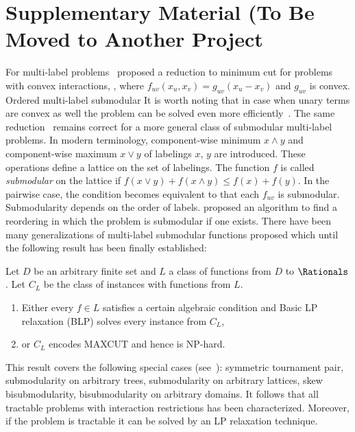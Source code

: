 \section{Supplementary Material (To Be Moved to Another Project}



For multi-label problems~\citet{Ishikawa03} proposed a reduction to minimum cut for problems with convex interactions, \ie, where $f_{uv}(x_u,x_v) = g_{uv}(x_u - x_v)$ and $g_{uv}$ is convex. %
Ordered multi-label submodular
It is worth noting that in case when unary terms are convex as well the problem can be solved even more efficiently~\cite{Hochbaum-2001-MRF,Kolmogorov05primal-dualalgorithm}. %
The same reduction~\cite{Ishikawa03} remains correct for a more general class of submodular multi-label problems. %
In modern terminology, component-wise minimum $x \wedge y$ and component-wise maximum $x \vee y$ of labelings $x$, $y$ are introduced. These operations define a lattice on the set of labelings. The function $f$ is called {\em submodular} on the lattice if $f(x \vee y) + f(x \wedge y) \leq f(x) + f(y)$. In the pairwise case, the condition becomes equivalent to that each $f_{uv}$ is submodular.
Submodularity depends on the order of labels. \citet{DSchlesinger-07-permuted} proposed an algorithm to find a reordering in which the problem is submodular if one exists.
There have been many generalizations of multi-label submodular functions proposed which until the following result has been finally established:
 \begin{theorem}
 Let $D$ be an arbitrary finite set and $L$ a class of functions from $D$ to $\Rationals$. Let $C_L$ be the class of instances with functions from $L$.
 \begin{enumerate}
 \item Either every $f \in L$ satisfies a certain algebraic condition
 and Basic LP relaxation (BLP) solves every instance from $C_L$,
 \item or $C_L$ encodes MAXCUT and hence is NP-hard.
 \end{enumerate}
 \end{theorem}
This result covers the following special cases (see~\cite{Thapper-13}): symmetric tournament pair, submodularity on arbitrary trees, submodularity on arbitrary lattices, skew bisubmodularity, bisubmodularity on arbitrary domains. It follows that all tractable problems with interaction restrictions has been characterized. Moreover, if the problem is tractable it can be solved by an LP relaxation technique.